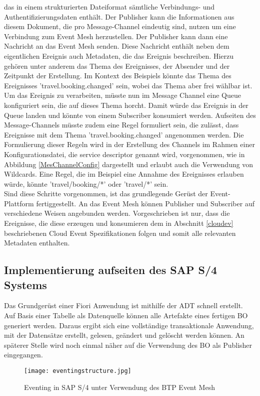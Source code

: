   das in einem strukturierten Dateiformat sämtliche Verbindungs- und Authentifizierungsdaten enthält. Der Publisher kann die Informationen aus diesem Dokument, die pro Message-Channel eindeutig sind, nutzen um eine Verbindung zum Event Mesh herzustellen. Der Publisher kann dann eine Nachricht an das Event Mesh senden. Diese Nachricht enthält neben dem eigentlichen Ereignis auch Metadaten, die das Ereignis beschreiben.  
  Hierzu gehören unter anderem das Thema des Ereignisses, der Absender und der Zeitpunkt der Erstellung. Im Kontext des Beispiels könnte das Thema des Ereignisses 'travel.booking.changed' sein, wobei das Thema aber frei wählbar ist. Um das Ereignis zu verarbeiten, müsste nun im Message Channel eine Queue konfiguriert sein, die auf dieses Thema horcht. Damit würde das Ereignis in der Queue landen und könnte von einem Subscriber konsumiert werden. 
  Aufseiten des Message-Channels müsste zudem eine Regel formuliert sein, die zulässt, dass Ereignisse mit dem Thema 'travel.booking.changed' angenommen werden. Die Formulierung dieser Regeln wird in der Erstellung des Channels im Rahmen einer Konfigurationsdatei, die service descriptor genannt wird, vorgenommen, wie in Abbildung \ref{MesChannelConfig} dargestellt und erlaubt auch die Verwendung von Wildcards. Eine Regel, die im Beispiel eine Annahme des Ereignisses erlauben würde, könnte 'travel/booking/*' oder 'travel/*' sein.\\

  Sind diese Schritte vorgenommen, ist das grundlegende Gerüst der Event-Plattform fertiggestellt. An das Event Mesh können Publisher und Subscriber auf verschiedene Weisen angebunden werden. Vorgeschrieben ist nur, dass die Ereignisse, die diese erzeugen und konsumieren dem in Abschnitt \ref{cloudev} beschriebenen Cloud Event Spezifikationen folgen und somit alle relevanten Metadaten enthalten.\\

  \subsection{Implementierung aufseiten des SAP S/4 Systems}
  Das Grundgerüst einer Fiori Anwendung ist mithilfe der \ac{ADT} schnell erstellt. Auf Basis einer Tabelle als Datenquelle können alle Artefakte eines fertigen \ac{BO} generiert werden. Daraus ergibt sich eine vollständige transaktionale Anwendung, mit der Datensätze erstellt, gelesen, geändert und gelöscht werden können. An späterer Stelle wird noch einmal näher auf die Verwendung des \ac{BO} als Publisher eingegangen.\\
  \begin{figure}[H]
    \centering
    \texttt{[image: eventingstructure.jpg]}
    \caption[Eventing in SAP S/4]{Eventing in SAP S/4 unter Verwendung des BTP Event Mesh \footnotemark}
    \label{BEstructure}
  \end{figure}

